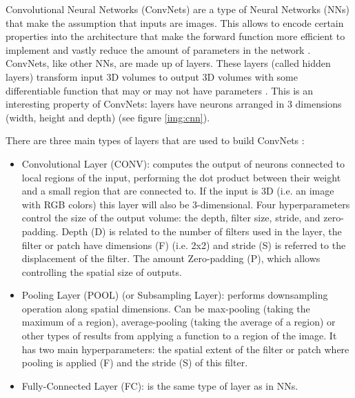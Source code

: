 \documentclass[]{article}
\begin{document}
Convolutional Neural Networks (ConvNets) are a type of Neural Networks (NNs) that make the assumption that inputs are images. This allows to encode certain properties into the architecture that make the forward function more efficient to implement and vastly reduce the amount of parameters in the network \cite{cs231convnets}.
ConvNets, like other NNs, are made up of layers. These layers (called hidden layers) transform input 3D volumes to output 3D volumes with some differentiable function that may or may not have parameters \cite{cs231convnets}. This is an interesting property of ConvNets: layers have neurons arranged in 3 dimensions (width, height and depth) (see figure \ref{img:cnn}). %

There are three main types of layers that are used to build ConvNets \cite{cs231convnets}: %
\begin{itemize}
	\item Convolutional Layer (CONV): computes the output of neurons connected to local regions of the input, performing the dot product between their weight and a small region that are connected to. If the input is 3D (i.e. an image with RGB colors) this layer will also be 3-dimensional. Four hyperparameters control the size of the output volume: the depth, filter size, stride, and zero-padding. Depth (D) is related to the number of filters used in the layer, the filter or patch have dimensions (F) (i.e. 2x2) and stride (S) is referred to the displacement of the filter. The amount Zero-padding (P), which allows controlling the spatial size of outputs.
	\item Pooling Layer (POOL) (or Subsampling Layer): performs downsampling operation along spatial dimensions. Can be max-pooling (taking the maximum of a region), average-pooling (taking the average of a region) or other types of results from applying a function to a region of the image. It has two main hyperparameters: the spatial extent of the filter or patch where pooling is applied (F) and the stride (S) of this filter.
	\item Fully-Connected Layer (FC): is the same type of layer as in NNs.
\end{itemize}
\end{document}
